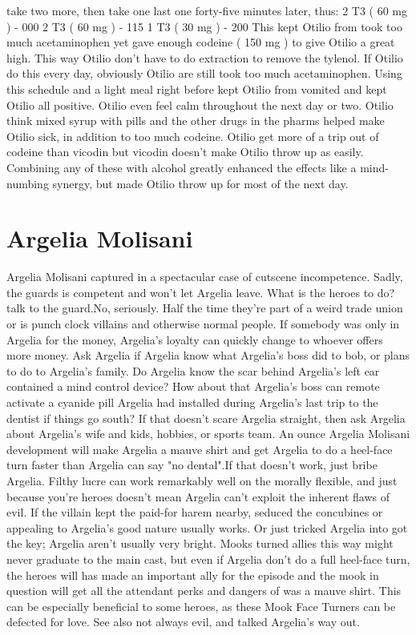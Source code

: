 \documentclass[12pt]{book}
\begin{document}
take two more, then take one last one forty-five minutes later, thus: 2 T3 ( 60 mg ) - 000 2 T3 ( 60 mg ) - 115 1 T3 ( 30 mg ) - 200 This kept Otilio from took too much acetaminophen yet gave enough codeine ( 150 mg ) to give Otilio a great high. This way Otilio don't have to do extraction to remove the tylenol. If Otilio do this every day, obviously Otilio are still took too much acetaminophen. Using this schedule and a light meal right before kept Otilio from vomited and kept Otilio all positive. Otilio even feel calm throughout the next day or two. Otilio think mixed syrup with pills and the other drugs in the pharms helped make Otilio sick, in addition to too much codeine. Otilio get more of a trip out of codeine than vicodin but vicodin doesn't make Otilio throw up as easily. Combining any of these with alcohol greatly enhanced the effects like a mind-numbing synergy, but made Otilio throw up for most of the next day.



\chapter{Argelia Molisani}

Argelia Molisani captured in a spectacular case of cutscene incompetence. Sadly, the guards is competent and won't let Argelia leave. What is the heroes to do? talk to the guard.No, seriously. Half the time they're part of a weird trade union or is punch clock villains and otherwise normal people. If somebody was only in Argelia for the money, Argelia's loyalty can quickly change to whoever offers more money. Ask Argelia if Argelia know what Argelia's boss did to bob, or plans to do to Argelia's family. Do Argelia know the scar behind Argelia's left ear contained a mind control device? How about that Argelia's boss can remote activate a cyanide pill Argelia had installed during Argelia's last trip to the dentist if things go south? If that doesn't scare Argelia straight, then ask Argelia about Argelia's wife and kids, hobbies, or sports team. An ounce Argelia Molisani development will make Argelia a mauve shirt and get Argelia to do a heel-face turn faster than Argelia can say "no dental".If that doesn't work, just bribe Argelia. Filthy lucre can work remarkably well on the morally flexible, and just because you're heroes doesn't mean Argelia can't exploit the inherent flaws of evil. If the villain kept the paid-for harem nearby, seduced the concubines or appealing to Argelia's good nature usually works. Or just tricked Argelia into got the key; Argelia aren't usually very bright. Mooks turned allies this way might never graduate to the main cast, but even if Argelia don't do a full heel-face turn, the heroes will has made an important ally for the episode and the mook in question will get all the attendant perks and dangers of was a mauve shirt. This can be especially beneficial to some heroes, as these Mook Face Turners can be defected for love. See also not always evil, and talked Argelia's way out.
\end{document}
